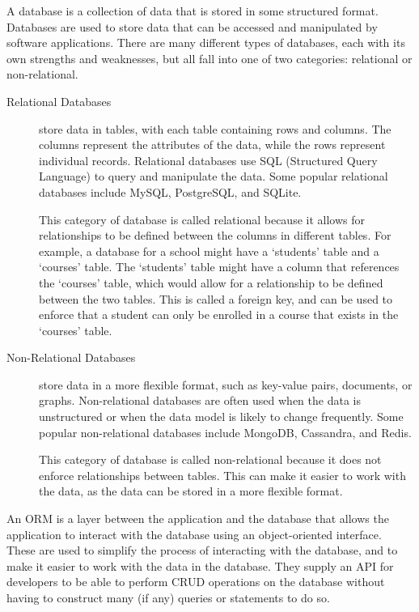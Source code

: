 \documentclass[12pt, a4paper,twoside]{report}
\theoremstyle{plain} %
\theoremstyle{definition} %
\numberwithin{equation}{chapter}
\begin{document}
A database is a collection of data that is stored in some structured
format. Databases are used to store data that can be accessed and
manipulated by software applications. There are many different types of
databases, each with its own strengths and weaknesses, but all fall into
one of two categories: relational or non-relational.

\begin{description}

    \item[Relational Databases] {
        store data in tables, with each table containing
        rows and columns. The columns represent the attributes of the data,
        while the rows represent individual records. Relational databases use
        SQL (Structured Query Language) to query and manipulate the data. Some
        popular relational databases include MySQL, PostgreSQL, and SQLite.

        This category of database is called relational because it allows for
        relationships to be defined between the columns in different tables.
        For example, a database for a school might have a `students' table and
        a `courses' table. The `students' table might have a column that
        references the `courses' table, which would allow for a relationship
        to be defined between the two tables. This is called a foreign key, and
        can be used to enforce that a student can only be enrolled in a course
        that exists in the `courses' table.
        }

    \item[Non-Relational Databases] {
        store data in a more flexible format, such as
        key-value pairs, documents, or graphs. Non-relational databases are
        often used when the data is unstructured or when the data model is
        likely to change frequently. Some popular non-relational databases
        include MongoDB, Cassandra, and Redis.

        This category of database is called non-relational because it does not
        enforce relationships between tables. This can make it easier to work
        with the data, as the data can be stored in a more flexible format.

        }

\end{description}

An ORM is a layer between the application and the database that allows the
application to interact with the database using an object-oriented interface.
These are used to simplify the process of interacting with the database, and
to make it easier to work with the data in the database. They supply an API for
developers to be able to perform CRUD operations on the database without having
to construct many (if any) queries or statements to do so.
\end{document}

